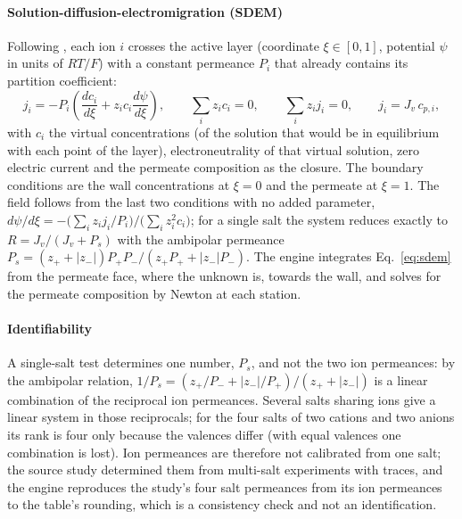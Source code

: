 \documentclass[preprint,12pt]{elsarticle}
\begin{document}
\paragraph{Solution-diffusion-electromigration (SDEM)}  Following
\citet{yaroshchuk2013}, each ion $i$ crosses the active layer (coordinate
$\xi\in[0,1]$, potential $\psi$ in units of $RT/F$) with a constant
permeance $P_i$ that already contains its partition coefficient:
\begin{equation}
j_i = -P_i\left(\frac{dc_i}{d\xi} + z_i c_i \frac{d\psi}{d\xi}\right),\qquad
\sum_i z_i c_i = 0,\qquad \sum_i z_i j_i = 0,\qquad j_i = J_v\, c_{p,i},
\label{eq:sdem}
\end{equation}
with $c_i$ the virtual concentrations (of the solution that would be in
equilibrium with each point of the layer), electroneutrality of that
virtual solution, zero electric current and the permeate composition as
the closure.  The boundary conditions are the wall concentrations at
$\xi=0$ and the permeate at $\xi=1$.  The field follows from the last two
conditions with no added parameter,
$d\psi/d\xi = -\big(\sum_i z_i j_i/P_i\big)/\big(\sum_i z_i^2 c_i\big)$;
for a single salt the system reduces exactly to $R = J_v/(J_v+P_s)$ with
the ambipolar permeance $P_s = (z_+ + |z_-|)P_+P_-/(z_+P_+ + |z_-|P_-)$.
The engine integrates Eq.~\eqref{eq:sdem} from the permeate face, where the
unknown is, towards the wall, and solves for the permeate composition by
Newton at each station.

\paragraph{Identifiability}  A single-salt test determines one number,
$P_s$, and not the two ion permeances: by the ambipolar relation,
$1/P_s = (z_+/P_- + |z_-|/P_+)/(z_+ + |z_-|)$ is a linear combination of
the reciprocal ion permeances.  Several salts sharing ions give a linear
system in those reciprocals; for the four salts of two cations and two
anions its rank is four only because the valences differ (with equal
valences one combination is lost).  Ion permeances are therefore not
calibrated from one salt; the source study determined them from multi-salt
experiments with traces, and the engine reproduces the study's four salt
permeances from its ion permeances to the table's rounding, which is a
consistency check and not an identification.
\end{document}
